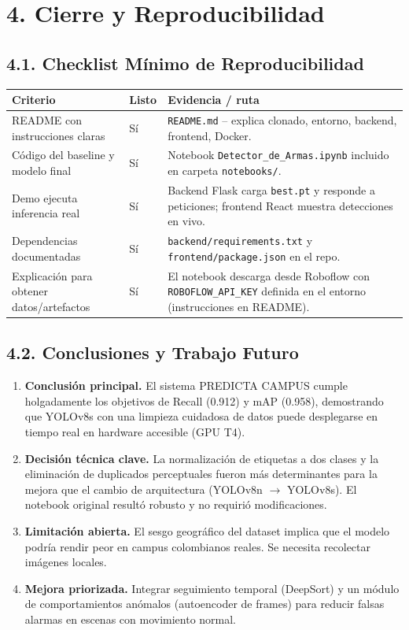 \documentclass[12pt, letterpaper]{article}
\begin{document}
\section{4. Cierre y Reproducibilidad}

\subsection{4.1. Checklist Mínimo de Reproducibilidad}

\begin{center}
\begin{tabular}{L{5cm} L{1cm} L{7cm}}
\toprule
\textbf{Criterio} & \textbf{Listo} & \textbf{Evidencia / ruta} \\
\midrule
README con instrucciones claras & Sí & \texttt{README.md} -- explica clonado, entorno, backend, frontend, Docker. \\
Código del baseline y modelo final & Sí & Notebook \texttt{Detector\_de\_Armas.ipynb} incluido en carpeta \texttt{notebooks/}. \\
Demo ejecuta inferencia real & Sí & Backend Flask carga \texttt{best.pt} y responde a peticiones; frontend React muestra detecciones en vivo. \\
Dependencias documentadas & Sí & \texttt{backend/requirements.txt} y \texttt{frontend/package.json} en el repo. \\
Explicación para obtener datos/artefactos & Sí & El notebook descarga desde Roboflow con \texttt{ROBOFLOW\_API\_KEY} definida en el entorno (instrucciones en README). \\
\bottomrule
\end{tabular}
\end{center}

\subsection{4.2. Conclusiones y Trabajo Futuro}

\begin{enumerate}
    \item \textbf{Conclusión principal.} El sistema PREDICTA CAMPUS cumple holgadamente los objetivos de Recall (0.912) y mAP (0.958), demostrando que YOLOv8s con una limpieza cuidadosa de datos puede desplegarse en tiempo real en hardware accesible (GPU T4).
    \item \textbf{Decisión técnica clave.} La normalización de etiquetas a dos clases y la eliminación de duplicados perceptuales fueron más determinantes para la mejora que el cambio de arquitectura (YOLOv8n $\rightarrow$ YOLOv8s). El notebook original resultó robusto y no requirió modificaciones.
    \item \textbf{Limitación abierta.} El sesgo geográfico del dataset implica que el modelo podría rendir peor en campus colombianos reales. Se necesita recolectar imágenes locales.
    \item \textbf{Mejora priorizada.} Integrar seguimiento temporal (DeepSort) y un módulo de comportamientos anómalos (autoencoder de frames) para reducir falsas alarmas en escenas con movimiento normal.
\end{enumerate}
\end{document}
